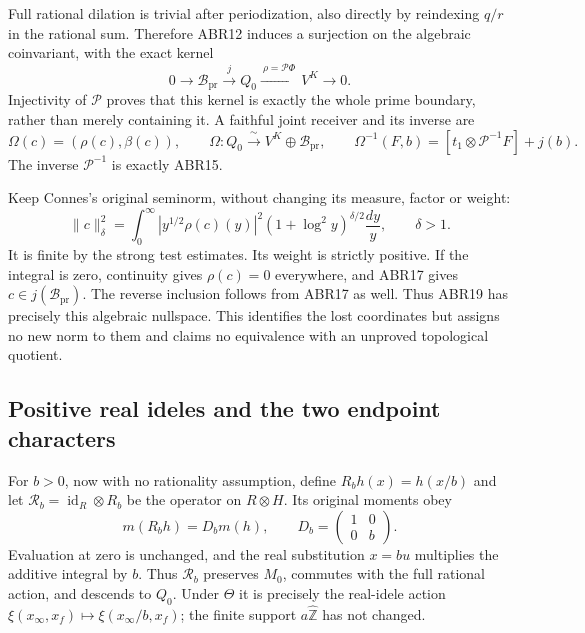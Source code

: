 \documentclass[11pt]{article}
\begin{document}
Full rational dilation is trivial after periodization, also
directly by reindexing $q/r$ in the rational sum. Therefore
ABR12 induces a surjection on the algebraic coinvariant, with
the exact kernel
\begin{equation}\tag{ABR17}
 0\longrightarrow\mathcal B_{\mathrm{pr}}
    \xrightarrow{\ j\ }Q_0
    \xrightarrow{\ \rho=\mathcal P\Phi\ }V^K
    \longrightarrow0.
\end{equation}
Injectivity of $\mathcal P$ proves that this kernel is exactly
the whole prime boundary, rather than merely containing it.
A faithful joint receiver and its inverse are
\begin{equation}\tag{ABR18}
 \Omega(c)=(\rho(c),\beta(c)),\qquad
 \Omega:Q_0\xrightarrow{\ \sim\ }V^K\oplus\mathcal B_{\mathrm{pr}},
 \qquad
 \Omega^{-1}(F,b)=[t_1\otimes\mathcal P^{-1}F]+j(b).
\end{equation}
The inverse $\mathcal P^{-1}$ is exactly ABR15.

Keep Connes's original seminorm, without changing its measure,
factor or weight:
\begin{equation}\tag{ABR19}
 \|c\|_\delta^2
  =\int_0^\infty|y^{1/2}\rho(c)(y)|^2
            (1+\log^2y)^{\delta/2}\frac{dy}{y},\qquad\delta>1.
\end{equation}
It is finite by the strong test estimates. Its weight is strictly
positive. If the integral is zero, continuity gives $\rho(c)=0$
everywhere, and ABR17 gives $c\in j(\mathcal B_{\mathrm{pr}})$.
The reverse inclusion follows from ABR17 as well. Thus ABR19
has precisely this algebraic nullspace. This identifies the
lost coordinates but assigns no new norm to them and claims
no equivalence with an unproved topological quotient.

\subsection{Positive real ideles and the two endpoint characters}

For $b>0$, now with no rationality assumption, define
$R_bh(x)=h(x/b)$ and let $\mathscr R_b=\operatorname{id}_R\otimes R_b$
be the operator on $R\otimes H$.
Its original moments obey
\begin{equation}\tag{ABR19a}
 m(R_bh)=D_bm(h),\qquad
 D_b=\begin{pmatrix}1&0\\0&b\end{pmatrix}.
\end{equation}
Evaluation at zero is unchanged, and the real substitution $x=bu$
multiplies the additive integral by $b$. Thus $\mathscr R_b$
preserves $M_0$, commutes with the full rational action, and
descends to $Q_0$. Under $\Theta$ it is precisely the real-idele
action $\xi(x_\infty,x_f)\mapsto\xi(x_\infty/b,x_f)$; the finite
support $a\widehat{\mathbb Z}$ has not changed.
\end{document}
